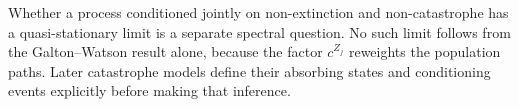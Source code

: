 Whether a process conditioned jointly on non-extinction and non-catastrophe has a
quasi-stationary limit is a separate spectral question.  No such limit follows
from the Galton--Watson result alone, because the factor \(c^{Z_j}\) reweights the
population paths.  Later catastrophe models define their absorbing states and
conditioning events explicitly before making that inference.

\FloatBarrier
